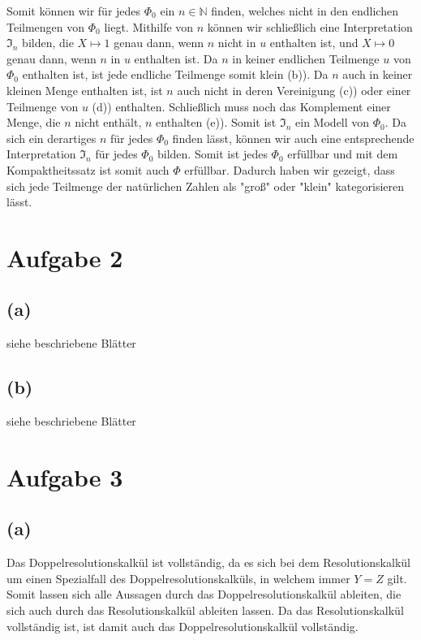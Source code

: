 \documentclass[11pt, a4paper]{article}
\begin{document}
Somit können wir für jedes $\Phi_0$ ein $n\in \mathbb{N}$ finden, welches nicht in den endlichen Teilmengen von $\Phi_0$ liegt. Mithilfe von $n$ können wir schließlich eine Interpretation $\mathfrak{I}_n$ bilden, die $X\mapsto 1$ genau dann, wenn $n$ nicht in $u$ enthalten ist, und $X\mapsto 0$ genau dann, wenn $n$ in $u$ enthalten ist.\newline
Da $n$ in keiner endlichen Teilmenge $u$ von $\Phi_0$ enthalten ist, ist jede endliche Teilmenge somit klein (b)). Da $n$ auch in keiner kleinen Menge enthalten ist, ist $n$ auch nicht in deren Vereinigung (c)) oder einer Teilmenge von $u$ (d)) enthalten. Schließlich muss noch das Komplement einer Menge, die $n$ nicht enthält, $n$ enthalten (e)). Somit ist $\mathfrak{I}_n$ ein Modell von $\Phi_0$.\newline
Da sich ein derartiges $n$ für jedes $\Phi_0$ finden lässt, können wir auch eine entsprechende Interpretation $\mathfrak{I}_n$ für jedes $\Phi_0$ bilden. Somit ist jedes $\Phi_0$ erfüllbar und mit dem Kompaktheitssatz ist somit auch $\Phi$ erfüllbar.\newline
Dadurch haben wir gezeigt, dass sich jede Teilmenge der natürlichen Zahlen als "groß" oder "klein" kategorisieren lässt.


\section*{Aufgabe 2}
\subsection*{(a)}
siehe beschriebene Blätter

\subsection*{(b)}
siehe beschriebene Blätter

\section*{Aufgabe 3}
\subsection*{(a)}
Das Doppelresolutionskalkül ist vollständig, da es sich bei dem Resolutionskalkül um einen Spezialfall des Doppelresolutionskalküls, in welchem immer $Y=Z$ gilt. Somit lassen sich alle Aussagen durch das Doppelresolutionskalkül ableiten, die sich auch durch das Resolutionskalkül ableiten lassen. Da das Resolutionskalkül vollständig ist, ist damit auch das Doppelresolutionskalkül vollständig.
\end{document}
